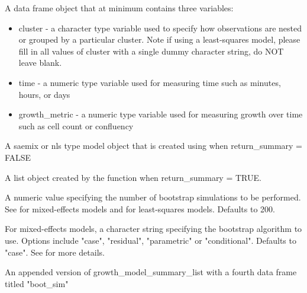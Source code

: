 \documentclass[a4paper]{book}
\begin{document}
\begin{Arguments}
\begin{ldescription}
\item[\code{data\_frame}] A data frame object that at minimum contains three
variables:
\begin{itemize}

\item{} cluster - a character type variable used to specify how observations
are nested or grouped by a particular cluster. Note if using a
least-squares model, please fill in all values of cluster with a single
dummy character string, do NOT leave blank.
\item{} time - a numeric type variable used for measuring time such as
minutes, hours, or days
\item{} growth\_metric - a numeric type variable used for measuring growth
over time such as cell count or confluency

\end{itemize}


\item[\code{growth\_model\_object}] A saemix or nls type model object that is
created using  when
return\_summary = FALSE

\item[\code{growth\_model\_summary\_list}] A list object created by the
 function when return\_summary = TRUE.

\item[\code{boot\_n\_sim}] A numeric value specifying the number of bootstrap
simulations to be performed. See 
for mixed-effects models and  for
least-squares models. Defaults to 200.

\item[\code{mix\_boot\_method}] For mixed-effects models, a character string
specifying the bootstrap algorithm to use. Options include "case",
"residual", "parametric" or "conditional". Defaults to "case". See
 for more details.
\end{ldescription}
\end{Arguments}
%
\begin{Value}
An appended version of growth\_model\_summary\_list with a fourth
data frame titled "boot\_sim"
\end{Value}
\end{document}
